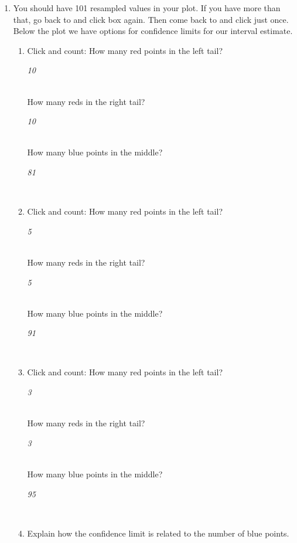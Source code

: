 \begin{enumerate}
 \item You should have 101 resampled values in your plot. If you have
   more than that, go  back to  and click
    box again. Then come back to  and
   click  just once.\\
   Below the plot we have options for confidence limits for our
   interval estimate.
   \begin{enumerate}
   \item Click  and count:  How many red points in the left tail?
\begin{key}
{\it  10}
\end{key}
     \\
     How many reds in the right tail?
\begin{key}
{\it  10}
\end{key}
     \\
     How many blue points in the middle?  
\begin{key}
{\it  81}
\end{key}
     \\
   \item Click  and count:  How many red points in the left tail?
\begin{key}
{\it  5}
\end{key}
     \\
     How many reds in the right tail?
\begin{key}
{\it  5}
\end{key}
     \\
     How many blue points in the middle?
\begin{key}
{\it  91}
\end{key}
     \\
  \item Click  and count:  How many red points in the left tail?
\begin{key}
{\it  3}
\end{key}
     \\
     How many reds in the right tail?
\begin{key}
{\it  3}
\end{key}
     \\
     How many blue points in the middle?
\begin{key}
{\it  95}
\end{key}
     \\
   \item Explain how the confidence limit is related to the number of
     blue points.
\begin{students}
  \vspace{1.5cm}
\end{students}


\end{enumerate}
\end{enumerate}
